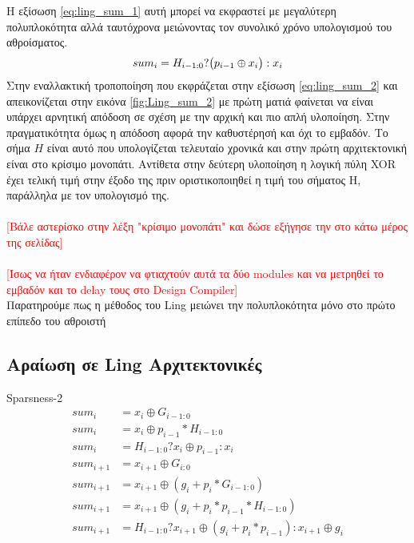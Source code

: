 Η εξίσωση \ref{eq:ling_sum_1} αυτή μπορεί να εκφραστεί με μεγαλύτερη πολυπλοκότητα 
αλλά ταυτόχρονα μειώνοντας τον συνολικό χρόνο υπολογισμού του αθροίσματος.
\begin{equation}
\label{eq:ling_sum_2}
\equationame{άθροισμα κατά Ling (2)}
    sum_i = H_{i-1:0} ? \big(p_{i-1} \oplus x_i\big) : x_i
\end{equation}
Στην εναλλακτική τροποποίηση που εκφράζεται στην εξίσωση \ref{eq:ling_sum_2} και 
απεικονίζεται στην εικόνα \ref{fig:Ling_sum_2} με πρώτη ματιά φαίνεται να είναι 
υπάρχει αρνητική απόδοση σε σχέση με την αρχική και πιο απλή υλοποίηση.
Στην πραγματικότητα όμως η απόδοση αφορά την καθυστέρησή και όχι το εμβαδόν. Το σήμα
$Η$ είναι αυτό που υπολογίζεται τελευταίο χρονικά και στην πρώτη αρχιτεκτονική
είναι στο κρίσιμο μονοπάτι. Αντίθετα στην δεύτερη υλοποίηση η λογική πύλη XOR 
έχει τελική τιμή στην έξοδο της πριν οριστικοποιηθεί η τιμή του σήματος H, παράλληλα 
με τον υπολογισμό της. 
\\\\
 \textcolor{red}{[Βάλε αστερίσκο στην λέξη "κρίσιμο μονοπάτι" και δώσε εξήγησε την στο
 κάτω μέρος της σελίδας]}
\\\\
 \textcolor{red}{[Ίσως να ήταν ενδιαφέρον να φτιαχτούν αυτά τα δύο modules και να μετρηθεί 
 το εμβαδόν και το delay τους στο Design Compiler]}
\\

 Παρατηρούμε πως η μέθοδος του Ling μειώνει την πολυπλοκότητα μόνο στο πρώτο επίπεδο 
 του αθροιστή
 
 
 
 
 
 
 \subsection{Αραίωση σε Ling Αρχιτεκτονικές}
 Sparsness-2
 \begin{equation*}
    \begin{split}
        sum_i &= x_i \oplus G_{i-1:0}\\
        sum_i &= x_i \oplus p_{i-1}*H_{i-1:0}\\
        sum_i &= H_{i-1:0} ? x_i \oplus p_{i-1} : x_i\\
        sum_{i+1} &= x_{i+1} \oplus G_{i:0}\\
        sum_{i+1} &= x_{i+1} \oplus (g_i + p_i*G_{i-1:0})\\
        sum_{i+1} &= x_{i+1} \oplus (g_i + p_i*p_{i-1}*H_{i-1:0})\\
        sum_{i+1} &= H_{i-1:0} ? x_{i+1} \oplus (g_i + p_i*p_{i-1}) : x_{i+1} \oplus g_i
    \end{split} 
 \end{equation*}
 
 
 